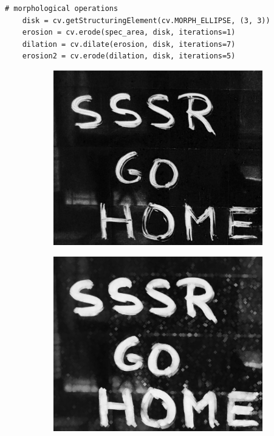 \begin{lstlisting}[caption={Исходный код для преобразования надписи}, label={lst:morphological}]
    # morphological operations
    disk = cv.getStructuringElement(cv.MORPH_ELLIPSE, (3, 3))
    erosion = cv.erode(spec_area, disk, iterations=1)
    dilation = cv.dilate(erosion, disk, iterations=7)
    erosion2 = cv.erode(dilation, disk, iterations=5)
\end{lstlisting}
\begin{figure}
    \centering
    \begin{subfigure}[b]{0.3\textwidth}
        \centering
        \includegraphics[width=\textwidth]{images/transformed_images/1/4 try/Erosed_1.jpg}
        \caption{}
        \label{img:Caption_erosed_1}
    \end{subfigure}
    \begin{subfigure}[b]{0.3\textwidth}
        \centering
        \includegraphics[width=\textwidth]{images/transformed_images/1/4 try/Dilation_7.jpg}

\end{subfigure}
\end{figure}
